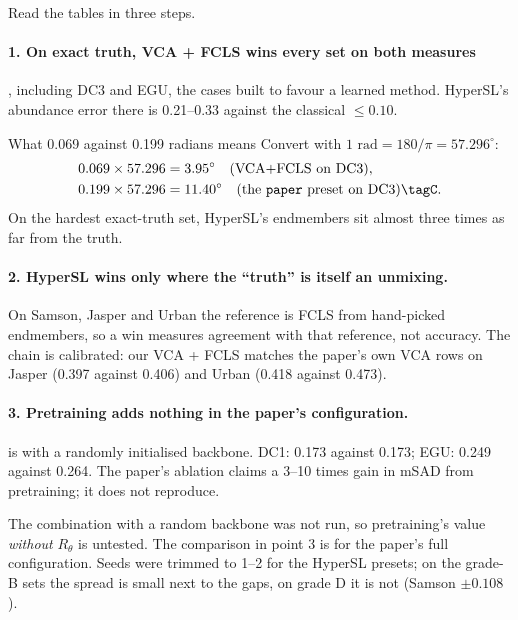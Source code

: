 Read the tables in three steps.

\paragraph{1. On exact truth, VCA + FCLS wins every set on both measures}, including DC3 and EGU, the cases built to
favour a learned method. HyperSL's abundance error there is 0.21--0.33 against the classical $\le0.10$.

\begin{worked}[label={we:hslunmix:deg}]{What 0.069 against 0.199 radians means}
Convert with $1\text{ rad}=180/\pi=57.296^\circ$:
\begin{align*}
0.069\times57.296 &= 3.95^\circ \quad\text{(VCA+FCLS on DC3)},\\
0.199\times57.296 &= 11.40^\circ \quad\text{(the \texttt{paper} preset on DC3)}\tagC .
\end{align*}
On the hardest exact-truth set, HyperSL's endmembers sit almost three times as far from the truth.
\end{worked}

\paragraph{2. HyperSL wins only where the ``truth'' is itself an unmixing.} On Samson, Jasper and Urban the reference
is FCLS from hand-picked endmembers, so a win measures agreement with that reference, not accuracy. The chain is
calibrated: our VCA + FCLS matches the paper's own VCA rows on Jasper (0.397 against 0.406) and Urban (0.418 against
0.473).

\paragraph{3. Pretraining adds nothing in the paper's configuration.}  is  with a randomly
initialised backbone. DC1: 0.173 against 0.173; EGU: 0.249 against 0.264. The paper's ablation claims a 3--10 times gain in
mSAD from pretraining; it does not reproduce.

\begin{sourcenote}
The combination  with a random backbone was not run, so pretraining's value \emph{without} $R_\theta$ is
untested. The comparison in point 3 is for the paper's full configuration. Seeds were trimmed to 1--2 for the HyperSL
presets; on the grade-B sets the spread is small next to the gaps, on grade D it is not (Samson 
$\pm0.108$).
\end{sourcenote}

